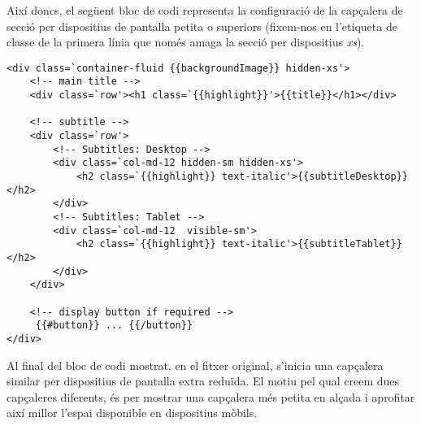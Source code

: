     Així doncs, el següent bloc de codi representa la configuració de la capçalera de secció per dispositius de pantalla petita o superiors (fixem-nos en l'etiqueta de classe de la primera línia que només amaga la secció per dispositius \emph{xs}).

    \begin{lstlisting}[style=rawOwn,caption={Posicionament de paràmetres amb Mustache en el HTML}]
<div class=`container-fluid {{backgroundImage}} hidden-xs'>
	<!-- main title -->
	<div class=`row'><h1 class=`{{highlight}}'>{{title}}</h1></div>

	<!-- subtitle -->
	<div class=`row'>
		<!-- Subtitles: Desktop -->
		<div class=`col-md-12 hidden-sm hidden-xs'>
			<h2 class=`{{highlight}} text-italic'>{{subtitleDesktop}}</h2>
		</div>
		<!-- Subtitles: Tablet -->
		<div class=`col-md-12  visible-sm'>
			<h2 class=`{{highlight}} text-italic'>{{subtitleTablet}}</h2>
		</div>
	</div>

	<!-- display button if required -->
	 {{#button}} ... {{/button}}
</div>
    \end{lstlisting}

    Al final del bloc de codi mostrat, en el fitxer original, s'inicia una capçalera similar per dispositius de pantalla extra reduïda. El motiu pel qual creem dues capçaleres diferents, és per mostrar una capçalera més petita en alçada i aprofitar així millor l'espai disponible en dispositius mòbils.
